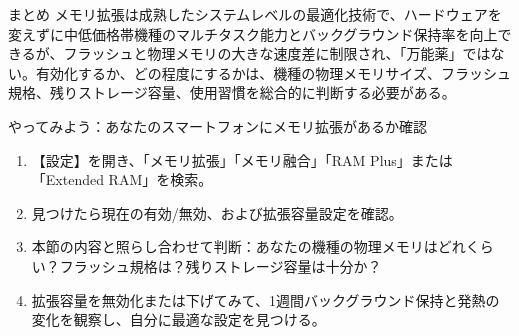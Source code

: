 \begin{tcbinfo}{まとめ}
メモリ拡張は成熟したシステムレベルの最適化技術で、ハードウェアを変えずに中低価格帯機種のマルチタスク能力とバックグラウンド保持率を向上できるが、フラッシュと物理メモリの大きな速度差に制限され、「万能薬」ではない。有効化するか、どの程度にするかは、機種の物理メモリサイズ、フラッシュ規格、残りストレージ容量、使用習慣を総合的に判断する必要がある。

\end{tcbinfo}

\begin{tcbpractice}{やってみよう：あなたのスマートフォンにメモリ拡張があるか確認}
\begin{enumerate}
  \item 【設定】を開き、「メモリ拡張」「メモリ融合」「RAM Plus」または「Extended RAM」を検索。
  \item 見つけたら現在の有効/無効、および拡張容量設定を確認。
  \item 本節の内容と照らし合わせて判断：あなたの機種の物理メモリはどれくらい？フラッシュ規格は？残りストレージ容量は十分か？
  \item 拡張容量を無効化または下げてみて、1週間バックグラウンド保持と発熱の変化を観察し、自分に最適な設定を見つける。
\end{enumerate}

\end{tcbpractice}
